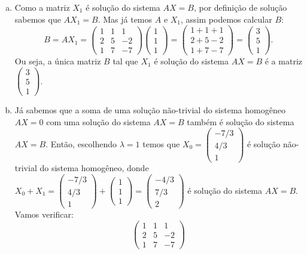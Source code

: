 \documentclass[a4paper,10pt]{article}
\newenvironment{sol}{\begin{tcolorbox}[breakable,colback=blue!5!white,colframe=blue!40!white,title=\normalsize {\sc{Solução}},coltitle=black]}{\end{tcolorbox}}
\begin{document}
\begin{sol}
\begin{enumerate}[a)]
		\item Como a matriz $X_1$ é solução do sistema $AX=B$, por definição de solução sabemos que $AX_1=B$. Mas já temos $A$ e $X_1$, assim podemos calcular $B$:
		\[B=AX_1=\begin{pmatrix}
		1&1&1\\2&5&-2\\1&7&-7
		\end{pmatrix}\begin{pmatrix}
		1\\1\\1
		\end{pmatrix}=\begin{pmatrix}
		1+1+1\\2+5-2\\1+7-7
		\end{pmatrix}=\begin{pmatrix}
		3\\5\\1
		\end{pmatrix}.\] Ou seja, a única matriz $B$ tal que $X_1$ é solução do sistema $AX=B$ é a matriz $\begin{pmatrix}
		3\\5\\1
		\end{pmatrix}$.
		\item Já sabemos que a soma de uma solução não-trivial do sistema homogêneo $AX=0$ com uma solução do sistema $AX=B$ também é solução do sistema $AX=B$. Então, escolhendo $\lambda=1$ temos que $X_0=\begin{pmatrix}
		-7/3\\4/3\\1
		\end{pmatrix}$ é solução não-trivial do sistema homogêneo, donde $X_0+X_1=\begin{pmatrix}
		-7/3\\4/3\\1
		\end{pmatrix}+\begin{pmatrix}
		1\\1\\1
		\end{pmatrix}=\begin{pmatrix}
		-4/3\\7/3\\2
		\end{pmatrix}$ é solução do sistema $AX=B$. Vamos verificar:
		\[\begin{pmatrix}
		1&1&1\\2&5&-2\\1&7&-7

\end{pmatrix}\]
\end{enumerate}
\end{sol}
\end{document}
